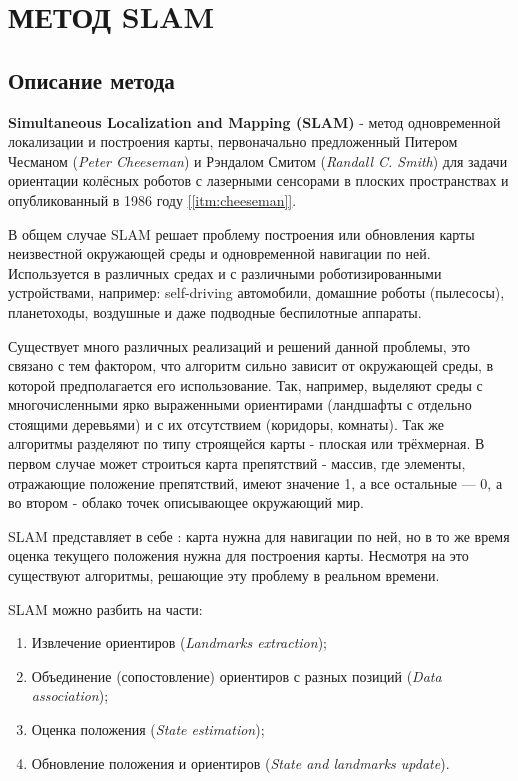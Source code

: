 \chapter{МЕТОД SLAM}

\section{Описание метода}

\textbf{Simultaneous Localization and Mapping (SLAM)} - метод одновременной локализации и построения карты, первоначально предложенный Питером Чесманом (\textit{Peter Cheeseman}) и Рэндалом Смитом (\textit{Randall C. Smith}) для задачи ориентации колёсных роботов с лазерными сенсорами в плоских пространствах и опубликованный в 1986 году \hyperref[itm:cheeseman]{[\ref{itm:cheeseman}]}.

В общем случае SLAM решает проблему построения или обновления карты неизвестной окружающей среды и одновременной навигации по ней. Используется в различных средах и с различными роботизированными устройствами, например: self-driving автомобили, домашние роботы (пылесосы), планетоходы, воздушные и даже подводные беспилотные аппараты.

Существует много различных реализаций и решений данной проблемы, это связано с тем фактором, что алгоритм сильно зависит от окружающей среды, в которой предполагается его использование. Так, например, выделяют среды с многочисленными ярко выраженными ориентирами (ландшафты с отдельно стоящими деревьями) и с их отсутствием (коридоры, комнаты). Так же алгоритмы разделяют по типу строящейся карты - плоская или трёхмерная. В первом случае может строиться карта препятствий - массив, где элементы, отражающие положение препятствий, имеют значение 1, а все остальные — 0, а во втором - облако точек описывающее окружающий мир.

SLAM представляет в себе : карта нужна для навигации по ней, но в то же время оценка текущего положения нужна для построения карты. Несмотря на это существуют алгоритмы, решающие эту проблему в реальном времени.

\vspace{1em}
SLAM можно разбить на части:
\begin{enumerate}
    \item Извлечение ориентиров (\textit{Landmarks extraction});
    \item Объединение (сопостовление) ориентиров с разных позиций (\textit{Data association});
    \item Оценка положения (\textit{State estimation});
    \item Обновление положения и ориентиров (\textit{State and landmarks update}).
\end{enumerate}


